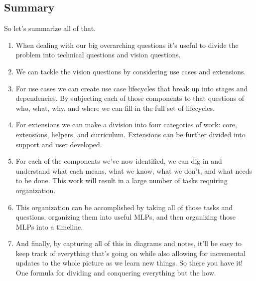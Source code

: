 \documentclass[10pt,a5paper]{book}
\begin{document}
\subsection{Summary}
So let's summarize all of that. 
\begin{enumerate}
\item When dealing with our big overarching questions it's useful to divide the problem into technical questions and vision questions.
\item We can tackle the vision questions by considering use cases and extensions.
\item For use cases we can create use case lifecycles that break up into stages and dependencies. By subjecting each of those components to that questions of who, what, why, and where we can fill in the full set of lifecycles.
\item For extensions we can make a division into four categories of work: core, extensions, helpers, and curriculum. Extensions can be further divided into support and user developed. 
\item For each of the components we've now identified, we can dig in and understand what each means, what we know, what we don't, and what needs to be done. This work will result in a large number of tasks requiring organization.
\item This organization can be accomplished by taking all of those tasks and questions, organizing them into useful MLPs, and then organizing those MLPs into a timeline.
\item And finally, by capturing all of this in diagrams and notes, it'll be easy to keep track of everything that's going on while also allowing for incremental updates to the whole picture as we learn new things. 
So there you have it! One formula for dividing and conquering everything but the how. 
\end{enumerate}
\end{document}
